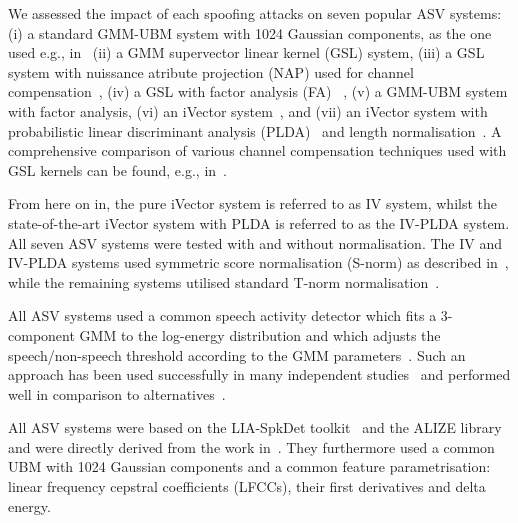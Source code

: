 
We assessed the impact of each spoofing attacks on seven popular ASV systems: (i) a standard GMM-UBM system with 1024 Gaussian components, as the one used e.g., in~\cite{Roy2012} (ii) a GMM supervector linear kernel (GSL) system, (iii) a GSL system with nuissance atribute projection (NAP) used for channel compensation~\cite{Campbell2006}, (iv) a GSL with factor analysis (FA) ~\cite{Fauve2007}, (v) a GMM-UBM system with factor analysis, (vi) an iVector system~\cite{Dehak2011}, and (vii) an iVector system  with probabilistic linear discriminant analysis (PLDA)~\cite{Li2012} and length normalisation~\cite{Garcia2011}. A comprehensive comparison of various channel compensation techniques used with GSL kernels can be found, e.g., in~\cite{McLaren2010}.

From here on in, the pure iVector system is referred to as IV system, whilst the state-of-the-art iVector system with PLDA is referred to as the IV-PLDA system. All seven ASV systems were tested with and without normalisation. The IV and IV-PLDA systems used symmetric score normalisation (S-norm) as described in~\cite{Kenny2010}, while the remaining systems utilised standard T-norm normalisation~\cite{Auckenthaler2000}.

All ASV systems used a common speech activity detector which fits a 3-component GMM to the log-energy distribution and which adjusts the speech/non-speech threshold according to the GMM parameters~\cite{Bimbot2004}.  Such an approach has been used successfully in many independent studies~\cite{magrin2001,fauve2008} and performed well in comparison to alternatives~\cite{sahidullah2012}. 

All ASV systems were based on the LIA-SpkDet toolkit~\cite{Bonastre2008} and the ALIZE library~\cite{Bonastre2004} and were directly derived from the work in~\cite{Fauve2007}.  They furthermore used a common UBM with 1024 Gaussian components and a common feature parametrisation: linear frequency cepstral coefficients (LFCCs), their first derivatives and delta energy.  




